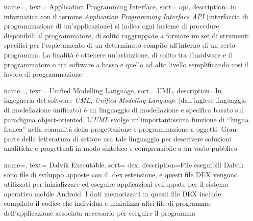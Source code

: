 \renewcommand{\acronymname}{Acronimi e abbreviazioni}

{
name=,
text= Application Programming Interface,
sort= api,
description={in informatica con il termine \emph{Application Programming Interface API} (interfaccia di programmazione di un'applicazione) si indica ogni insieme di procedure disponibili al programmatore, di solito raggruppate a formare un set di strumenti specifici per l'espletamento di un determinato compito all'interno di un certo programma.
La finalità è ottenere un'astrazione, di solito tra l'hardware e il programmatore o tra software a basso e quello ad alto livello semplificando così il lavoro di programmazione}
}

{
name=,
text= Unified Modelling Language,
sort= UML,
description={In ingegneria del software \emph{UML, Unified Modeling Language} (dall'inglese linguaggio di modellazione unificato) è un linguaggio di modellazione e specifica basato sul paradigma object-oriented.
L'\emph{UML} svolge un'importantissima funzione di ``lingua franca'' nella comunità della progettazione e programmazione a oggetti.
Gran parte della letteratura di settore usa tale linguaggio per descrivere soluzioni analitiche e progettuali in modo sintetico e comprensibile a un vasto pubblico}
}


{
name=,
text= Dalvik Executable,
sort= dex,
description={File eseguibili Dalvik sono file di sviluppo apposte con il .dex estensione, e questi file DEX vengono utilizzati per inizializzare ed eseguire applicazioni sviluppate per il sistema operativo mobile Android.
I dati memorizzati in questi file DEX include compilato il codice che individua e inizializza altri file di programma dell'applicazione associata necessario per eseguire il programma}
}


